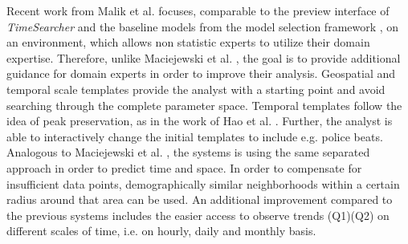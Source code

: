 \documentclass[electronic]{vgtc}             %
\begin{document}
Recent work from Malik et al. \cite{malik:2014} focuses, comparable to the preview interface of \textit{TimeSearcher} \cite{buono:2005} and the baseline models from the model selection framework \cite{lu:2014}, on an environment, which allows non statistic experts to utilize their domain expertise.
Therefore, unlike Maciejewski et al. \cite{maciejewski:2011}, the goal is to provide additional guidance for domain experts in order to improve their analysis.
Geospatial and temporal scale templates provide the analyst with a starting point and avoid searching through the complete parameter space.
Temporal templates follow the idea of peak preservation, as in the work of Hao et al. \cite{Hao:2012}.
Further, the analyst is able to interactively change the initial templates to include e.g. police beats.
Analogous to Maciejewski et al. \cite{maciejewski:2011, maciejewski:2010}, the systems is using the same separated approach in order to predict time and space.
In order to compensate for insufficient data points, demographically similar neighborhoods within a certain radius around that area can be used. 
An additional improvement compared to the previous systems includes the easier access to observe trends (Q1)(Q2) on different scales of time, i.e. on hourly, daily and monthly basis.
\end{document}
